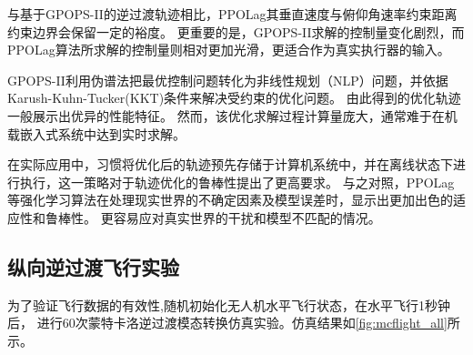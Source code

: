 与基于GPOPS-II的逆过渡轨迹相比，PPOLag其垂直速度与俯仰角速率约束距离约束边界会保留一定的裕度。
更重要的是，GPOPS-II求解的控制量变化剧烈，而PPOLag算法所求解的控制量则相对更加光滑，更适合作为真实执行器的输入。

GPOPS-II利用伪谱法把最优控制问题转化为非线性规划（NLP）问题，并依据Karush-Kuhn-Tucker(KKT)条件来解决受约束的优化问题。
由此得到的优化轨迹一般展示出优异的性能特征。
然而，该优化求解过程计算量庞大，通常难于在机载嵌入式系统中达到实时求解。

在实际应用中，习惯将优化后的轨迹预先存储于计算机系统中，并在离线状态下进行执行，这一策略对于轨迹优化的鲁棒性提出了更高要求。
与之对照，PPOLag等强化学习算法在处理现实世界的不确定因素及模型误差时，显示出更加出色的适应性和鲁棒性。
更容易应对真实世界的干扰和模型不匹配的情况。

\subsection{纵向逆过渡飞行实验}
为了验证飞行数据的有效性,随机初始化无人机水平飞行状态，在水平飞行1秒钟后，
进行60次蒙特卡洛逆过渡模态转换仿真实验。仿真结果如\autoref{fig:mcflight_all}所示。
